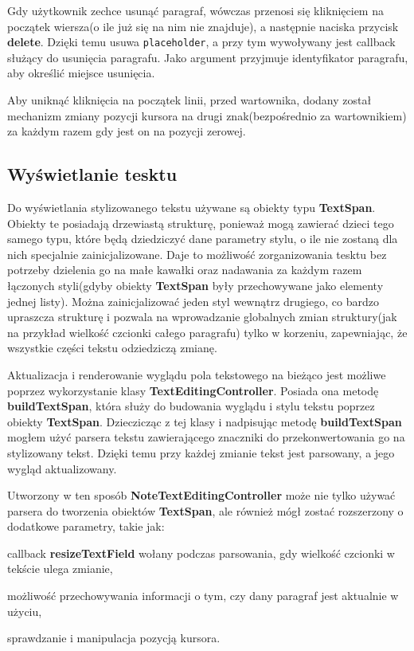 Gdy użytkownik zechce usunąć paragraf, wówczas przenosi się kliknięciem na początek wiersza(o ile już się na nim nie znajduje), a następnie naciska przycisk \textbf{delete}. Dzięki temu usuwa \verb|placeholder|, a przy tym wywoływany jest callback służący do usunięcia paragrafu. Jako argument przyjmuje identyfikator paragrafu, aby określić miejsce usunięcia.

Aby uniknąć kliknięcia na początek linii, przed wartownika, dodany został mechanizm zmiany pozycji kursora na drugi znak(bezpośrednio za wartownikiem) za każdym razem gdy jest on na pozycji zerowej.

\subsection{Wyświetlanie tesktu}

Do wyświetlania stylizowanego tekstu używane są obiekty typu \textbf{TextSpan}. Obiekty te posiadają drzewiastą strukturę, ponieważ mogą zawierać dzieci tego samego typu, które będą dziedziczyć dane parametry stylu, o ile nie zostaną dla nich specjalnie zainicjalizowane. Daje to możliwość zorganizowania tesktu bez potrzeby dzielenia go na małe kawałki oraz nadawania za każdym razem łączonych styli(gdyby obiekty \textbf{TextSpan} były przechowywane jako elementy jednej listy). Można zainicjalizować jeden styl wewnątrz drugiego, co bardzo upraszcza strukturę i pozwala na wprowadzanie globalnych zmian struktury(jak na przykład wielkość czcionki całego paragrafu) tylko w korzeniu, zapewniając, że wszystkie części tekstu odziedziczą zmianę.

Aktualizacja i renderowanie wyglądu pola tekstowego na bieżąco jest możliwe poprzez wykorzystanie klasy \textbf{TextEditingController}. Posiada ona metodę \textbf{buildTextSpan}, która służy do budowania wyglądu i stylu tekstu poprzez obiekty \textbf{TextSpan}. Dzieczicząc z tej klasy i nadpisując metodę \textbf{buildTextSpan} mogłem użyć parsera tekstu zawierającego znaczniki do przekonwertowania go na stylizowany tekst.
Dzięki temu przy każdej zmianie tekst jest parsowany, a jego wygląd aktualizowany.

Utworzony w ten sposób \textbf{NoteTextEditingController} może nie tylko używać parsera do tworzenia obiektów \textbf{TextSpan}, ale również mógł zostać rozszerzony o dodatkowe parametry, takie jak:

\begin{compactitem}
    \item callback \textbf{resizeTextField} wołany podczas parsowania, gdy wielkość czcionki w tekście ulega zmianie, 
    \item możliwość przechowywania informacji o tym, czy dany paragraf jest aktualnie w użyciu,
    \item sprawdzanie i manipulacja pozycją kursora.
\end{compactitem}

